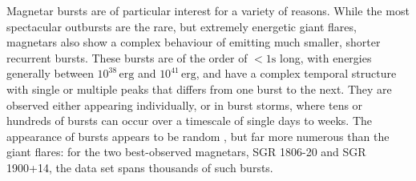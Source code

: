 \documentclass[12pt]{emulateapj}
\begin{document}

Magnetar bursts are of particular interest for a variety of reasons. While the most spectacular outbursts are the rare, but extremely energetic giant flares,
magnetars also show a complex behaviour of emitting much smaller, shorter recurrent bursts. These bursts are of the order of $<1\mathrm{s}$ long, with energies
generally between $10^{38}\,\mathrm{erg}$ and $10^{41}\,\mathrm{erg}$, and have a complex temporal structure with single or
multiple peaks that differs from one burst to the next. They are observed either appearing individually, or in burst 
storms, where tens or hundreds of bursts can occur over a timescale of single days to weeks\citep{mazets1999,goetz2006b,israel2008,mereghetti2009,savchenko2010,israel2010,scholz2011,dib2012,vanderhorst2012,vonkienlin2012}. 
The appearance of bursts appears to be random \citep{gogus1999,gogus2000}, but far more numerous than the giant flares: 
for the two best-observed magnetars, SGR 1806-20 and SGR 1900+14, the
data set spans thousands of such bursts. 
\end{document}
